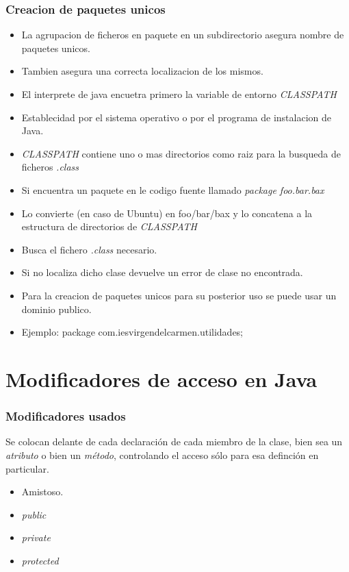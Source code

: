 \documentclass{beamer}
\begin{document}
\begin{frame}
    \frametitle{Creacion de paquetes unicos}
\begin{footnotesize}
\begin{itemize}[<+->]
\item La agrupacion de ficheros en paquete en un subdirectorio asegura nombre de paquetes unicos.
\item Tambien asegura una correcta localizacion de los mismos.
\item El interprete de java encuetra primero la variable de entorno \emph{CLASSPATH}
\item Establecidad por el sistema operativo o por el programa de instalacion de Java.
\item \emph{CLASSPATH} contiene uno o mas directorios como raiz para la busqueda de ficheros \emph{.class}
\item Si encuentra un paquete en le codigo fuente llamado \emph{package foo.bar.bax}
\item Lo convierte (en caso de Ubuntu) en foo/bar/bax y lo concatena a la estructura de directorios de \emph{CLASSPATH}
\item Busca el fichero \emph{.class} necesario.
\item Si no localiza dicho clase devuelve un error de clase no encontrada.
\item Para la creacion de paquetes unicos para su posterior uso se puede usar un dominio publico.
\item Ejemplo: package com.iesvirgendelcarmen.utilidades;
\end{itemize}
\end{footnotesize}
\pause
\end{frame}

\section{Modificadores de acceso en Java}
\begin{frame}
\frametitle{Modificadores usados}
Se colocan delante de cada declaración de cada miembro de la clase, bien sea un \emph{atributo} o bien un \emph{método}, controlando el acceso sólo para esa definción en particular.
\begin{itemize}[<+-|alert@+>]
\item Amistoso.
\item \emph{public}
\item \emph{private}
\item \emph{protected}
\end{itemize}
\pause
\end{frame}
\end{document}
